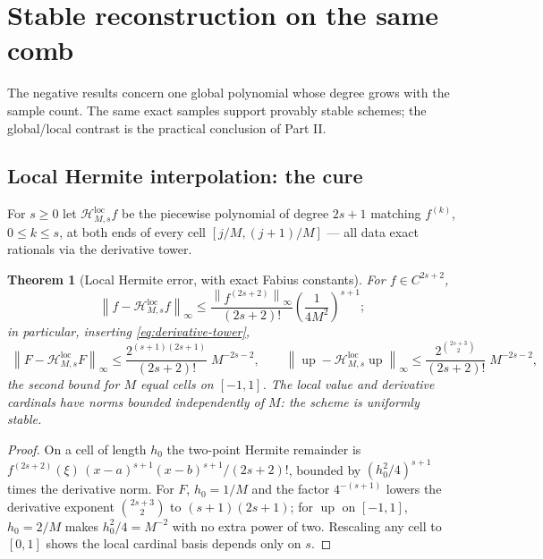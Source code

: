 \documentclass[11pt,oneside]{article}
\numberwithin{equation}{section}
\newtheorem{theorem}{Theorem}[section]
\theoremstyle{definition}
\theoremstyle{remark}
\newcommand{\Up}{\operatorname{up}}
\newcommand{\norm}[1]{\left\lVert #1\right\rVert}
\begin{document}
\section{Stable reconstruction on the same comb}
\label{sec:alternatives}

The negative results concern one global polynomial whose degree grows
with the sample count.  The same exact samples support provably
stable schemes; the global/local contrast is the practical conclusion
of Part II.

\subsection{Local Hermite interpolation: the cure}

For $s\ge0$ let $\mathcal H^{\mathrm{loc}}_{M,s}f$ be the piecewise
polynomial of degree $2s+1$ matching $f^{(k)}$, $0\le k\le s$, at both
ends of every cell $[j/M,(j+1)/M]$ --- all data exact rationals via
the derivative tower.

\begin{theorem}[Local Hermite error, with exact Fabius constants]
\label{thm:local-error}
For $f\in C^{2s+2}$,
\begin{equation}
 \norm{f-\mathcal H^{\mathrm{loc}}_{M,s}f}_\infty
 \le\frac{\norm{f^{(2s+2)}}_\infty}{(2s+2)!}
 \left(\frac{1}{4M^{2}}\right)^{s+1};
 \label{eq:local-general}
\end{equation}
in particular, inserting \eqref{eq:derivative-tower},
\begin{equation}
 \boxed{\;
 \norm{F-\mathcal H^{\mathrm{loc}}_{M,s}F}_\infty
 \le\frac{2^{(s+1)(2s+1)}}{(2s+2)!}\;M^{-2s-2},
 \qquad
 \norm{\Up-\mathcal H^{\mathrm{loc}}_{M,s}\Up}_\infty
 \le\frac{2^{\binom{2s+3}{2}}}{(2s+2)!}\;M^{-2s-2},
 \;}
 \label{eq:local-F-bound}
\end{equation}
the second bound for $M$ equal cells on $[-1,1]$.  The local value
and derivative cardinals have norms bounded independently of $M$: the
scheme is uniformly stable.
\end{theorem}

\begin{proof}
On a cell of length $h_0$ the two-point Hermite remainder is
$f^{(2s+2)}(\xi)\,(x-a)^{s+1}(x-b)^{s+1}/(2s+2)!$, bounded by
$(h_0^{2}/4)^{s+1}$ times the derivative norm.  For $F$, $h_0=1/M$
and the factor $4^{-(s+1)}$ lowers the derivative exponent
$\binom{2s+3}2$ to $(s+1)(2s+1)$; for $\Up$ on $[-1,1]$, $h_0=2/M$
makes $h_0^{2}/4=M^{-2}$ with no extra power of two.  Rescaling any
cell to $[0,1]$ shows the local cardinal basis depends only on $s$.
\end{proof}
\end{document}
